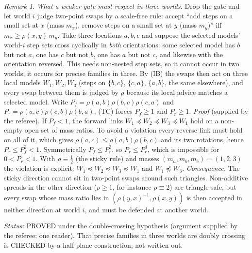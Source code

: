 \documentclass[11pt]{article}
\theoremstyle{definition}\newtheorem{definition}[theorem]{Definition}
\theoremstyle{remark}\newtheorem{remark}[theorem]{Remark}
\newcommand{\status}[1]{\par\noindent\emph{Status:} #1\par}
\begin{document}
\begin{remark}\label{rem:triangle}
\emph{What a weaker gate must respect in three worlds.} Drop the gate and let
world $i$ judge two-point swaps by a scale-free rule: accept ``add steps on a
small set at $x$ (mass $m_x$), remove steps on a small set at $y$ (mass
$m_y$)'' iff $m_x\ge\rho(x,y)\,m_y$. Take three locations $a,b,c$ and suppose
the selected models' world-$i$ step sets cross cyclically in \emph{both}
orientations: some selected model has $b$ but not $a$, one has $c$ but not
$b$, one has $a$ but not $c$, and likewise with the orientation reversed. This
needs non-nested step sets, so it cannot occur in two worlds; it occurs for
precise families in three. By (IB) the swaps then act on three local models
$W_1,W_2,W_3$ (steps on $\{b,c\}$, $\{c,a\}$, $\{a,b\}$, the same elsewhere),
and every swap between them is judged by $\rho$ because its local advice
matches a selected model. Write $P_f=\rho(a,b)\rho(b,c)\rho(c,a)$ and
$P_r=\rho(a,c)\rho(c,b)\rho(b,a)$. (TC) forces $P_f\ge1$ and $P_r\ge1$.
\emph{Proof} (supplied by the referee). If $P_f<1$, the forward links
$W_1\preceq W_2\preceq W_3\preceq W_1$ hold on a non-empty open set of mass
ratios. To avoid a violation every reverse link must hold on all of it, which
gives $\rho(a,c)\le\rho(a,b)\rho(b,c)$ and its two rotations, hence $P_r\le
P_f^2<1$. Symmetrically $P_f\le P_r^2$, so $P_r\le P_r^4$, which is impossible
for $0<P_r<1$. With $\rho\equiv\frac12$ (the sticky rule) and masses
$(m_a,m_b,m_c)=(1,2,3)$ the violation is explicit: $W_1\preceq W_2\preceq
W_3\preceq W_1$ and $W_1\not\preceq W_3$. \emph{Consequence.} The sticky
direction cannot sit in two-point swaps around such triangles. Non-additive
spreads in the other direction ($\rho\ge1$, for instance $\rho\equiv2$) are
triangle-safe, but every swap whose mass ratio lies in
$(\rho(y,x)^{-1},\rho(x,y))$ is then accepted in neither direction at world
$i$, and must be defended at another world.
\end{remark}

\status{PROVED under the double-crossing hypothesis (argument supplied by the referee; one reader). That precise families in three worlds are doubly crossing is CHECKED by a half-plane construction, not written out.}
\end{document}
